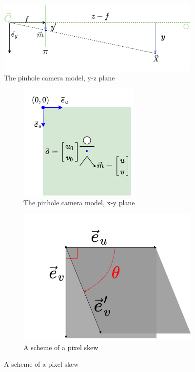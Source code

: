 \begin{figure}[h]
    \centering
    \includegraphics[width=0.9\textwidth]{graphics/td_scene_yz.png}
    \caption{The pinhole camera model, y-z plane}
    \label{fig:td_scene_yz}
\end{figure}

\begin{figure}[h]
  \begin{subfigure}[b]{0.49\textwidth}
    \centering
    \includegraphics[width=.5\textwidth]{graphics/td_scene_xy.png}
    \caption{The pinhole camera model, x-y plane}
    \label{fig:td_scene_xy}
  \end{subfigure}
  \hfill
  \begin{subfigure}[b]{0.49\textwidth}
    \centering
    \includegraphics[width=.5\textwidth]{graphics/pixel.png}
    \caption{A scheme of a pixel skew}
    \label{fig:Kframes}
  \end{subfigure}
\end{figure}

